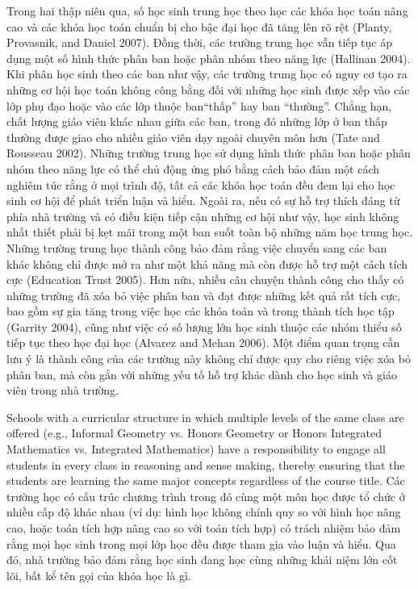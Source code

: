 \documentclass[
  10pt,
  a4paper,
  landscape,
  twoside,
  openany
]{scrbook}
\newcommand{\EN}[1]{#1}
\newcommand{\VI}[1]{#1}
\newcommand{\NOTE}[1]{#1}
\begin{document}
{
\VI{Trong hai thập niên qua, số học sinh trung học theo học các khóa học toán nâng cao và các khóa học toán chuẩn bị cho bậc đại học đã tăng lên rõ rệt (Planty, Provasnik, and Daniel 2007). Đồng thời, các trường trung học vẫn tiếp tục áp dụng một số hình thức phân ban hoặc phân nhóm theo năng lực (Hallinan 2004). Khi phân học sinh theo các ban như vậy, các trường trung học có nguy cơ tạo ra những cơ hội học toán không công bằng đối với những học sinh được xếp vào các lớp phụ đạo hoặc vào các lớp thuộc ban``thấp'' hay ban ``thường''. Chẳng hạn, chất lượng giáo viên khác nhau giữa các ban, trong đó những lớp ở ban thấp thường được giao cho nhiều giáo viên dạy ngoài chuyên môn hơn (Tate and Rousseau 2002). Những trường trung học sử dụng hình thức phân ban hoặc phân nhóm theo năng lực có thể chủ động ứng phó bằng cách bảo đảm một cách nghiêm túc rằng ở mọi trình độ, tất cả các khóa học toán đều đem lại cho học sinh cơ hội để phát triển luận và hiểu. Ngoài ra, nếu có sự hỗ trợ thích đáng từ phía nhà trường và có điều kiện tiếp cận những cơ hội như vậy, học sinh không nhất thiết phải bị kẹt mãi trong một ban suốt toàn bộ những năm học trung học. Những trường trung học thành công bảo đảm rằng việc chuyển sang các ban khác không chỉ được mở ra như một khả năng mà còn được hỗ trợ một cách tích cực (Education Trust 2005). Hơn nữa, nhiều câu chuyện thành công cho thấy có những trường đã xóa bỏ việc phân ban và đạt được những kết quả rất tích cực, bao gồm sự gia tăng trong việc học các khóa toán và trong thành tích học tập (Garrity 2004), cũng như việc có số lượng lớn học sinh thuộc các nhóm thiểu số tiếp tục theo học đại học (Alvarez and Mehan 2006). Một điểm quan trọng cần lưu ý là thành công của các trường này không chỉ được quy cho riêng việc xóa bỏ phân ban, mà còn gắn với những yếu tố hỗ trợ khác dành cho học sinh và giáo viên trong nhà trường.}
}
{
\NOTE{}
}

\TriPara
{
\EN{Schools with a curricular structure in which multiple levels of the same class are offered (e.g., Informal Geometry vs. Honors Geometry or Honors Integrated Mathematics vs. Integrated Mathematics) have a responsibility to engage all students in every class in reasoning and sense making, thereby ensuring that the students are learning the same major concepts regardless of the course title.}
}
{
\VI{Các trường học có cấu trúc chương trình trong đó cùng một môn học được tổ chức ở nhiều cấp độ khác nhau (ví dụ: hình học không chính quy so với hình học nâng cao, hoặc toán tích hợp nâng cao so với toán tích hợp) có trách nhiệm bảo đảm rằng mọi học sinh trong mọi lớp học đều được tham gia vào luận và hiểu. Qua đó, nhà trường bảo đảm rằng học sinh đang học cùng những khái niệm lớn cốt lõi, bất kể tên gọi của khóa học là gì.}
}
{
\NOTE{}
}
\end{document}

